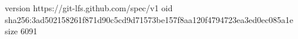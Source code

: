version https://git-lfs.github.com/spec/v1
oid sha256:3ad502158261f871d90c5cd9d71573be157f8aa120f4794723ea3ed0ec085a1e
size 6091
